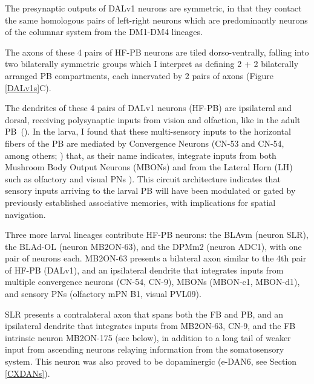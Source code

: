 
    The presynaptic outputs of DALv1 neurons are symmetric, in that they contact the same homologous pairs of left-right neurons which are predominantly neurons of the columnar system from the DM1-DM4 lineages.

    The axons of these 4 pairs of HF-PB neurons are tiled dorso-ventrally, falling into two bilaterally symmetric groups which I interpret as defining 2 + 2 bilaterally arranged PB compartments, each innervated by 2 pairs of axons (Figure \ref{DALv1s}C). 

    The dendrites of these 4 pairs of DALv1 neurons (HF-PB) are ipsilateral and dorsal, receiving polysynaptic inputs from vision and olfaction, like in the adult PB~(\citep{hulse2021connectome}). In the larva, I found that these multi-sensory inputs to the horizontal fibers of the PB are mediated by Convergence Neurons (CN-53 and CN-54, among others; \citep{eschbach2021circuits}) that, as their name indicates, integrate inputs from both Mushroom Body Output Neurons (MBONs) and from the Lateral Horn (LH) such as olfactory and visual PNs \citep{eschbach2020recurrent}). This circuit architecture indicates that sensory inputs arriving to the larval PB will have been modulated or gated by previously established associative memories, with implications for spatial navigation.

    Three more larval lineages contribute HF-PB neurons: the BLAvm (neuron SLR), the BLAd-OL (neuron MB2ON-63), and the DPMm2 (neuron ADC1),  with one pair of neurons each. 
    MB2ON-63 presents a bilateral axon similar to the 4th pair of HF-PB (DALv1), and an ipsilateral dendrite that integrates inputs from multiple convergence neurons (CN-54, CN-9), MBONs (MBON-c1, MBON-d1), and sensory PNs (olfactory mPN B1, visual PVL09).

    SLR presents a contralateral axon that spans both the FB and PB, and an ipsilateral dendrite that integrates inputs from MB2ON-63, CN-9, and the FB intrinsic neuron MB2ON-175 (see below), in addition to a long tail of weaker input from ascending neurons relaying information from the somatosensory system. This neuron was also proved to be dopaminergic (e-DAN6, see Section \ref{CXDANs}). 

